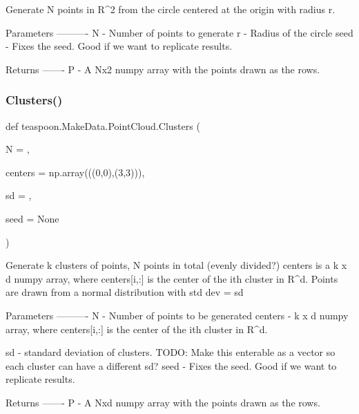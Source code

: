 \begin{DoxyVerb}Generate N points in R^2 from the circle centered
at the origin with radius r.

Parameters
----------
N -
    Number of points to generate
r -
    Radius of the circle
seed -
    Fixes the seed.  Good if we want to replicate results.


Returns
-------
P -  
    A Nx2 numpy array with the points drawn as the rows.\end{DoxyVerb}
 \mbox{\label{namespaceteaspoon_1_1_make_data_1_1_point_cloud_a130af3abbe5cb02a99c3f64d3f3dd979}} 
\subsubsection{\texorpdfstring{Clusters()}{Clusters()}}
{\footnotesize\ttfamily def teaspoon.\+Make\+Data.\+Point\+Cloud.\+Clusters (\begin{DoxyParamCaption}\item[{}]{N = {},  }\item[{}]{centers = {\ttfamily np.array(((0,0),(3,3)))},  }\item[{}]{sd = {},  }\item[{}]{seed = {\ttfamily None} }\end{DoxyParamCaption})}

\begin{DoxyVerb}Generate k clusters of points, N points in total (evenly divided?)
centers is a k x d numpy array, where centers[i,:] is the center of 
the ith cluster in R^d.
Points are drawn from a normal distribution with std dev = sd

Parameters
----------
N -
    Number of points to be generated
centers -
    k x d numpy array, where centers[i,:] is the center of 
    the ith cluster in R^d.

sd - 
    standard deviation of clusters.
    TODO: Make this enterable as a vector so each cluster can have
    a different sd?
seed -
    Fixes the seed.  Good if we want to replicate results.

Returns
-------
P -  
    A Nxd numpy array with the points drawn as the rows.\end{DoxyVerb}
 \mbox{\label{namespaceteaspoon_1_1_make_data_1_1_point_cloud_ad2738d11d9b3018aab5d163587239518}} 

